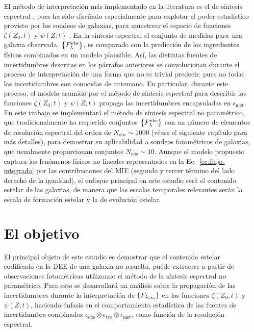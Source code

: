 El método de interpretación más implementado en la literatura es el de síntesis espectral
\citep[pero véase \eg,][]{Chen2012}, pues ha sido diseñado especialmente para explotar el poder
estadístico provisto por los sondeos de galaxias, para muestrear el espacio de funciones
$\zeta(Z_0,t)$ y $\psi(Z;t)$ \citep[\eg,][]{Heavens2000, Kauffmann2003}. En la síntesis espectral el
conjunto de medidas para una galaxia observada, $\set{\sedt[F]{obs}}$, es comparado con la
predicción de los ingredientes físicos combinados en un modelo plausible. Así, las distintas fuentes
de incertidumbres descritas en los párrafos anteriores se convolucionan durante el proceso de
interpretación de una forma que no es trivial predecir, pues no todas las incertidumbres son
conocidas de antemano. En particular, durante este proceso, el modelo asumido por el método de
síntesis espectral para describir las funciones $\zeta(Z_0,t)$ y $\psi(Z;t)$ propaga las
incertidumbres encapsuladas en $\epsilon_\text{met}$. En este trabajo se implementará el método de
síntesis espectral no paramétrico, que tradicionalmente ha requerido conjuntos $\set{\sedt[F]{obs}}$
con un número de elementos de resolución espectral del orden de $N_\text{obs}\sim1000$ (véase el
siguiente capítulo para más detalles), para demostrar su aplicabilidad a sondeos fotométricos de
galaxias, que usualmente proporcionan conjuntos $N_\text{obs}\sim10$. Aunque el modelo propuesto
captura los fenómenos físicos no lineales representados en la Ec.~\eqref{ec:flujo-integrado} por las
contribuciones del MIE (segundo y tercer término del lado derecho de la igualdad), el enfoque
principal en este estudio será el contenido estelar de las galaxias, de manera que las escalas
temporales relevantes serán la escala de formación estelar y la de evolución estelar.

\section{El objetivo}

El principal objeto de este estudio es demostrar que el contenido estelar codificado en la DEE de
una galaxia no resuelta, puede extraerse a partir de observaciones fotométricas utilizando el método
de la síntesis espectral no paramétrico. Para esto se desarrollará un análisis sobre la propagación
de las incertidumbres durante la interpretación de $\set{F_{\lambda_\text{obs}}}$ en las funciones
$\zeta(Z_0,t)$ y $\psi(Z;t)$, haciendo énfasis en el comportamiento estadístico de las fuentes de
incertidumbre combinadas $\epsilon_\text{obs} \otimes \epsilon_\text{teo} \otimes
\epsilon_\text{met}$, como función de la resolución espectral.

